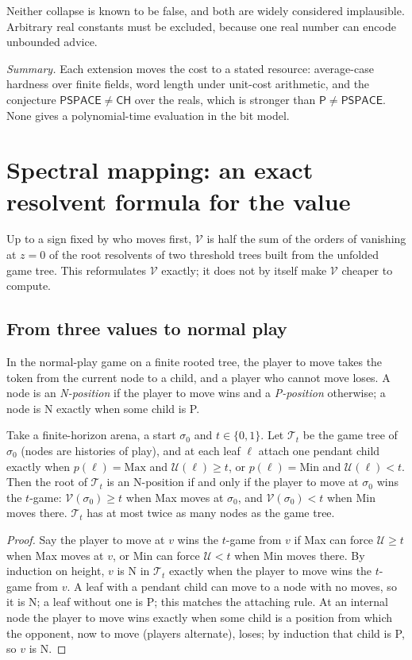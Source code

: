 \documentclass[final]{siamart0516}
\numberwithin{theorem}{section}
\numberwithin{equation}{section}
\theoremstyle{siamnonum}
\theoremstyle{plain}
\newcommand{\val}{\mathcal{V}}            %
\newcommand{\pay}{\mathcal{U}}            %
\newcommand{\cls}[1]{\mathsf{#1}}
\newcommand{\PSPACE}{\cls{PSPACE}}
\newcommand{\Pclass}{\cls{P}}
\newcommand{\CH}{\cls{CH}}
\begin{document}
Neither collapse is known to be false, and both are widely considered implausible. Arbitrary real constants must be excluded, because one real number can encode unbounded advice.

\noindent\emph{Summary.} Each extension moves the cost to a stated resource: average-case hardness over finite fields, word length under unit-cost arithmetic, and the conjecture $\PSPACE\neq\CH$ over the reals, which is stronger than $\Pclass\neq\PSPACE$. None gives a polynomial-time evaluation in the bit model.

\section{Spectral mapping: an exact resolvent formula for the value}\label{sec:spectral}

Up to a sign fixed by who moves first, $\val$ is half the sum of the orders of vanishing at $z=0$ of the root resolvents of two threshold trees built from the unfolded game tree. This reformulates $\val$ exactly; it does not by itself make $\val$ cheaper to compute.

\subsection{From three values to normal play}
In the normal-play game on a finite rooted tree, the player to move takes the token from the current node to a child, and a player who cannot move loses. A node is an \emph{N-position} if the player to move wins and a \emph{P-position} otherwise; a node is N exactly when some child is P.

\begin{lemma}\label{lem:threshold}
Take a finite-horizon arena, a start $\sigma_0$ and $t\in\{0,1\}$. Let $\mathcal T_t$ be the game tree of $\sigma_0$ (nodes are histories of play), and at each leaf $\ell$ attach one pendant child exactly when $p(\ell)=\mathrm{Max}$ and $\pay(\ell)\ge t$, or $p(\ell)=\mathrm{Min}$ and $\pay(\ell)<t$. Then the root of $\mathcal T_t$ is an N-position if and only if the player to move at $\sigma_0$ wins the $t$-game: $\val(\sigma_0)\ge t$ when Max moves at $\sigma_0$, and $\val(\sigma_0)<t$ when Min moves there. $\mathcal T_t$ has at most twice as many nodes as the game tree.
\end{lemma}

\begin{proof}
Say the player to move at $v$ wins the $t$-game from $v$ if Max can force $\pay\ge t$ when Max moves at $v$, or Min can force $\pay<t$ when Min moves there. By induction on height, $v$ is N in $\mathcal T_t$ exactly when the player to move wins the $t$-game from $v$. A leaf with a pendant child can move to a node with no moves, so it is N; a leaf without one is P; this matches the attaching rule. At an internal node the player to move wins exactly when some child is a position from which the opponent, now to move (players alternate), loses; by induction that child is P, so $v$ is N.
\end{proof}
\end{document}
